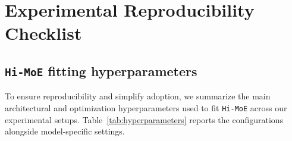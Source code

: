 \documentclass[sigconf,nonacm]{acmart}
\begin{document}






\appendix
\section{Experimental Reproducibility Checklist}
\label{app:repro}
\subsection{\texttt{Hi-MoE} fitting hyperparameters}
To ensure reproducibility and simplify adoption, we summarize the main architectural and optimization hyperparameters used to fit \texttt{Hi-MoE} across our experimental setups. Table~\ref{tab:hyperparameters} reports the configurations alongside model-specific settings.
\end{document}
